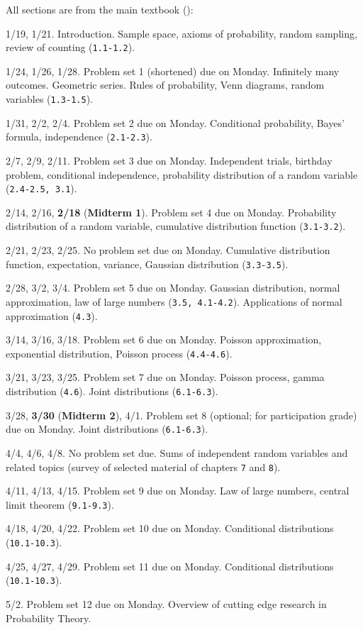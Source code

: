 \documentclass[oneside,11pt]{amsart}
\begin{document}
All sections are from the main textbook ():
\begin{enumerate}[\bf{}{[}week 1{]}]
	\item 1/19, 1/21.
		Introduction. Sample space, axioms of probability, random sampling, review of counting 
		(\texttt{1.1-1.2}).
	\item 1/24, 1/26, 1/28.
		Problem set 1 (shortened) due on Monday.
		Infinitely many outcomes. Geometric series. 
		Rules of probability, Venn diagrams, random variables
		(\texttt{1.3-1.5}).
	\item 1/31, 2/2, 2/4.
		Problem set 2 due on Monday.
		Conditional probability, Bayes' formula, independence
		(\texttt{2.1-2.3}).
	\item 2/7, 2/9, 2/11.
		Problem set 3 due on Monday.
		Independent trials, birthday problem, conditional independence, 
		probability distribution of a random variable
		(\texttt{2.4-2.5, 3.1}).
	\item 2/14, 2/16, \textbf{2/18} (\textbf{Midterm 1}).
		Problem set 4 due on Monday.
		Probability distribution of a random variable,
		cumulative distribution function (\texttt{3.1-3.2}).
	\item 2/21, 2/23, 2/25.
		No problem set due on Monday.
		Cumulative distribution function, 
		expectation, variance, 
		Gaussian distribution
		(\texttt{3.3-3.5}).
	\item 2/28, 3/2, 3/4.
		Problem set 5 due on Monday.
		Gaussian distribution, normal approximation,
		law of large numbers
		(\texttt{3.5, 4.1-4.2}).
		Applications of normal approximation (\texttt{4.3}).
	\item 3/14, 3/16, 3/18.
		Problem set 6 due on Monday.
		Poisson approximation, exponential distribution, Poisson process
		(\texttt{4.4-4.6}).
	\item 3/21, 3/23, 3/25.
		Problem set 7 due on Monday.
		Poisson process, gamma distribution (\texttt{4.6}). 
		Joint distributions (\texttt{6.1-6.3}).
	\item 3/28, \textbf{3/30} (\textbf{Midterm 2}), 4/1.
		Problem set 8 (optional; for participation grade) due on Monday.
		Joint distributions (\texttt{6.1-6.3}).
	\item 4/4, 4/6, 4/8.
		No problem set due.
		Sums of independent random variables and related topics (survey of 
		selected material of chapters \texttt{7} and \texttt{8}).
	\item 4/11, 4/13, 4/15.
		Problem set 9 due on Monday.
		Law of large numbers, central limit theorem (\texttt{9.1-9.3}).
	\item 4/18, 4/20, 4/22.
		Problem set 10 due on Monday.
		Conditional distributions (\texttt{10.1-10.3}).
	\item 4/25, 4/27, 4/29.
		Problem set 11 due on Monday.
		Conditional distributions (\texttt{10.1-10.3}).
	\item 5/2.
		Problem set 12 due on Monday.
		Overview of cutting edge research in Probability Theory.
\end{enumerate}
\end{document}
